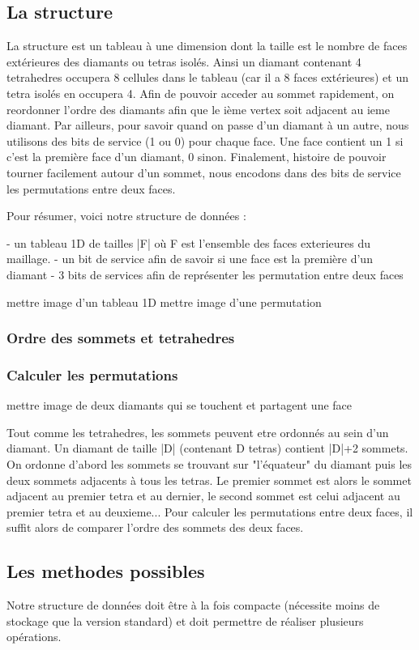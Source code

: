 \documentclass[a4paper,11pt,openany]{article}
\begin{document}
\subsection{La structure}
La structure est un tableau à une dimension dont la taille est le nombre de faces extérieures des diamants ou tetras isolés.
Ainsi un diamant contenant 4 tetrahedres occupera 8 cellules dans le tableau (car il  a 8 faces extérieures) et un tetra isolés en occupera 4.
Afin de pouvoir acceder au sommet rapidement, on reordonner l'ordre des diamants afin que le ième vertex soit adjacent au ieme diamant.
Par ailleurs, pour savoir quand on passe d'un diamant à un autre, nous utilisons des bits de service (1 ou 0) pour chaque face. Une face contient un 1 si c'est la première face d'un diamant, 0 sinon.
Finalement, histoire de pouvoir tourner facilement autour d'un sommet, nous encodons dans des bits de service les permutations entre deux faces.

Pour résumer, voici notre structure de données :

- un tableau 1D de tailles |F| où F est l'ensemble des faces exterieures du maillage.
- un bit de service afin de savoir si une face est la première d'un diamant
- 3 bits de services afin de représenter les permutation entre deux faces


mettre image d'un tableau 1D
mettre image d'une permutation

\subsubsection{Ordre des sommets et tetrahedres}

\subsubsection{Calculer les permutations}
mettre image de deux diamants qui se touchent et partagent une face

Tout comme les tetrahedres, les sommets peuvent etre ordonnés au sein d'un diamant. Un diamant de taille |D| (contenant D tetras) contient |D|+2 sommets.
On ordonne d'abord les sommets se trouvant sur "l'équateur" du diamant puis les deux sommets adjacents à tous les tetras.
Le premier sommet est alors le sommet adjacent au premier tetra et au dernier, le second sommet est celui adjacent au premier tetra et au deuxieme...
Pour calculer les permutations entre deux faces, il suffit alors de comparer l'ordre des sommets des deux faces.

\subsection{Les methodes possibles}
Notre structure de données doit être à la fois compacte (nécessite moins de stockage que la version standard) et doit permettre de réaliser plusieurs opérations.
\end{document}

